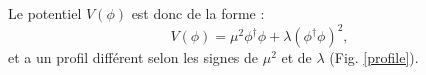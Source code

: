 Le potentiel $V(\phi)$ est donc de la forme :
\begin{equation}
V(\phi)=\mu^{2}\phi^{\dagger}\phi+\lambda\left(\phi^{\dagger}\phi\right)^2,
\end{equation}
et a un profil différent selon les signes de $\mu^{2}$ et de $\lambda$ (Fig. \ref{profile}).
